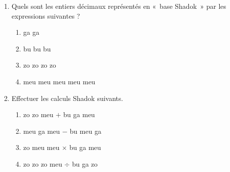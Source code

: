\begin{td}
\noindent\begin{enumerate}
\item Quels sont les entiers décimaux représentés en «~base Shadok~» 
	par les expressions suivantes ?
	\begin{enumerate}
	\item {\sc ga} {\sc ga}
	\item {\sc bu} {\sc bu} {\sc bu}
	\item {\sc zo} {\sc zo} {\sc zo} {\sc zo}
	\item {\sc meu} {\sc meu} {\sc meu} {\sc meu} {\sc meu} 
	\end{enumerate}	
\item Effectuer les calculs Shadok suivants.
	\begin{enumerate}
	\item {\sc zo} {\sc zo} {\sc meu} $+$ {\sc bu} {\sc ga} {\sc meu}
	\item {\sc meu} {\sc ga} {\sc meu} $-$ {\sc bu} {\sc meu} {\sc ga}
	\item {\sc zo} {\sc meu} {\sc meu} $\times$ {\sc bu} {\sc ga} {\sc meu}
	\item {\sc zo} {\sc zo} {\sc zo} {\sc meu} $\div$ {\sc bu} {\sc ga} {\sc zo}
	\end{enumerate}
\end{enumerate}
\end{td}


